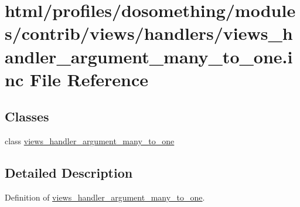 \hypertarget{views__handler__argument__many__to__one_8inc}{
\section{html/profiles/dosomething/modules/contrib/views/handlers/views\_\-handler\_\-argument\_\-many\_\-to\_\-one.inc File Reference}
\label{views__handler__argument__many__to__one_8inc}
}
\subsection*{Classes}
\begin{DoxyCompactItemize}
\item 
class \hyperlink{classviews__handler__argument__many__to__one}{views\_\-handler\_\-argument\_\-many\_\-to\_\-one}
\end{DoxyCompactItemize}


\subsection{Detailed Description}
Definition of \hyperlink{classviews__handler__argument__many__to__one}{views\_\-handler\_\-argument\_\-many\_\-to\_\-one}. 